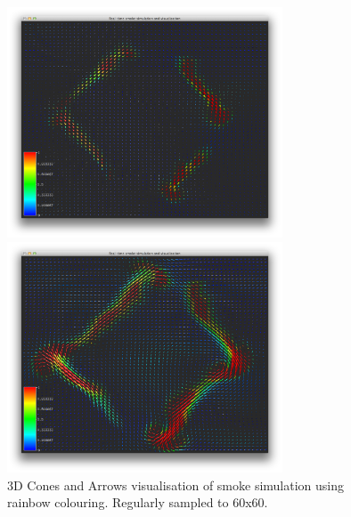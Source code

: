 \begin{figure}[htbp]
\begin{center}
\begin{minipage}[t]{0.48\textwidth}
\includegraphics[height=2.7in]{figures/glyph/d3cones.png}
\end{minipage}
\begin{minipage}[t]{0.48\textwidth}
\includegraphics[height=2.7in]{figures/glyph/d3arrows.png}
\end{minipage}
\caption{3D Cones and Arrows visualisation of smoke simulation using rainbow colouring. Regularly sampled to 60x60.}
\label{fig:d3conesArrows}
\end{center}
\end{figure}



%
%


